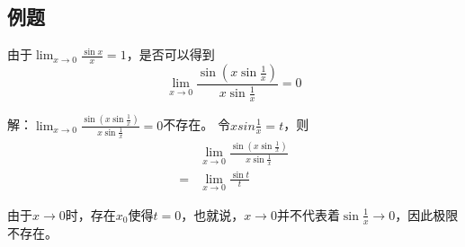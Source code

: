 \documentclass[UTF8]{ctexart}
\begin{document}
	\subsection{例题}
		由于$\lim_{x\rightarrow 0} \frac{\sin x}{x}=1$，是否可以得到
		$$
		\lim _{x\rightarrow 0}
		\frac{\sin(x\sin {\frac{1}{x}})}
		{x\sin{\frac{1}{x}}}=0
		$$
		
		解：$
		\lim _{x\rightarrow 0}
		\frac{\sin(x\sin {\frac{1}{x}})}
		{x\sin{\frac{1}{x}}}=0
		$不存在。	
		令$xsin \frac{1}{x}=t$，则
		\begin{equation}
			\begin{split}
				&\lim _{x\rightarrow 0}
				\frac{\sin(x\sin {\frac{1}{x}})}
				{x\sin{\frac{1}{x}}}\\
				=&\lim _{x\rightarrow 0}
				\frac{\sin t}{t}
			\end{split}
		\end{equation}

	由于$x\rightarrow 0$时，存在$x_0$使得$t=0$，也就说，$x\rightarrow 0$并不代表着$\sin{\frac{1}{x} \rightarrow 0}$，因此极限不存在。
	
	
\end{document}
